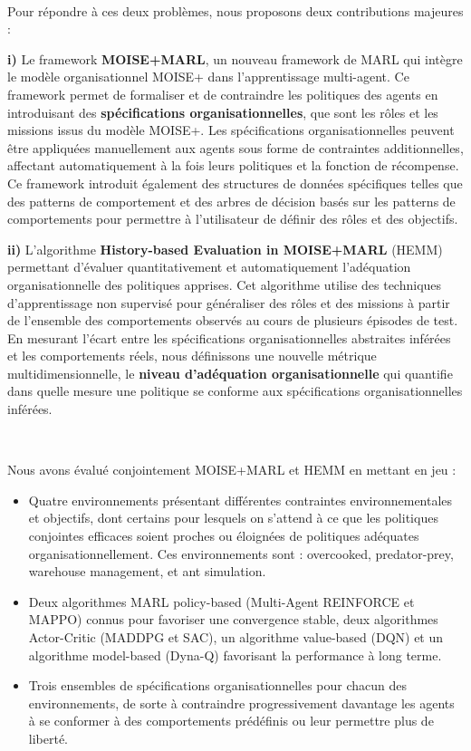 \documentclass[sigconf,anonymous]{aamas}
\begin{document}
\

\noindent Pour répondre à ces deux problèmes, nous proposons deux contributions majeures :

\quad \textbf{i)} Le framework \textbf{MOISE+MARL}, un nouveau framework de MARL qui intègre le modèle organisationnel MOISE+ dans l'apprentissage multi-agent. Ce framework permet de formaliser et de contraindre les politiques des agents en introduisant des \textbf{spécifications organisationnelles}, que sont les rôles et les missions issus du modèle MOISE+. Les spécifications organisationnelles peuvent être appliquées manuellement aux agents sous forme de contraintes additionnelles, affectant automatiquement à la fois leurs politiques et la fonction de récompense. Ce framework introduit également des structures de données spécifiques telles que des patterns de comportement et des arbres de décision basés sur les patterns de comportements pour permettre à l'utilisateur de définir des rôles et des objectifs.

\quad \textbf{ii)} L'algorithme \textbf{History-based Evaluation in MOISE+MARL} (HEMM) permettant d'évaluer quantitativement et automatiquement l'adéquation organisationnelle des politiques apprises. Cet algorithme utilise des techniques d'apprentissage non supervisé pour généraliser des rôles et des missions à partir de l'ensemble des comportements observés au cours de plusieurs épisodes de test. En mesurant l'écart entre les spécifications organisationnelles abstraites inférées et les comportements réels, nous définissons une nouvelle métrique multidimensionnelle, le \textbf{niveau d'adéquation organisationnelle} qui quantifie dans quelle mesure une politique se conforme aux spécifications organisationnelles inférées.

\

\noindent Nous avons évalué conjointement MOISE+MARL et HEMM en mettant en jeu :
\begin{itemize}
  \item Quatre environnements présentant différentes contraintes environnementales et objectifs, dont certains pour lesquels on s'attend à ce que les politiques conjointes efficaces soient proches ou éloignées de politiques adéquates organisationnellement. Ces environnements sont : overcooked, predator-prey, warehouse management, et ant simulation.
  \item Deux algorithmes MARL policy-based (Multi-Agent REINFORCE et MAPPO) connus pour favoriser une convergence stable, deux algorithmes Actor-Critic (MADDPG et SAC), un algorithme value-based (DQN) et un algorithme model-based (Dyna-Q) favorisant la performance à long terme.
  \item Trois ensembles de spécifications organisationnelles pour chacun des environnements, de sorte à contraindre progressivement davantage les agents à se conformer à des comportements prédéfinis ou leur permettre plus de liberté.
\end{itemize}
\end{document}
